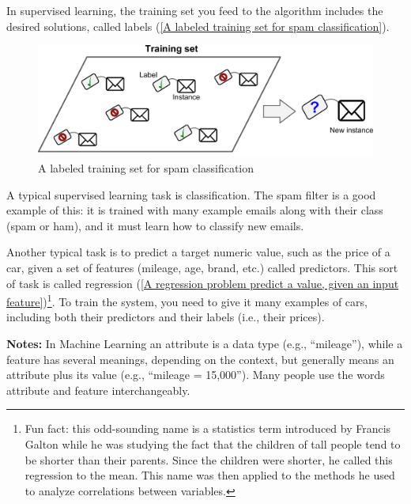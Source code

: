 In supervised learning, the training set you feed to the algorithm includes the desired
solutions, called labels (\autoref{A labeled training set for spam classification}).
\begin{figure}
\centering
\includegraphics{img/A labeled training set for spam classification.png}
\caption{A labeled training set for spam classification}
\label{A labeled training set for spam classification}
\end{figure}

A typical supervised learning task is classification. The spam filter is a good example
of this: it is trained with many example emails along with their class (spam or ham),
and it must learn how to classify new emails.

Another typical task is to predict a target numeric value, such as the price of a car,
given a set of features (mileage, age, brand, etc.) called predictors. This sort of task is
called regression (\autoref{A regression problem predict a value, given an input feature})\footnote{Fun fact: this odd-sounding name is a statistics term introduced by Francis Galton while he was studying the
fact that the children of tall people tend to be shorter than their parents. Since the children were shorter, he
called this regression to the mean. This name was then applied to the methods he used to analyze correlations
between variables.}. To train the system, you need to give it many examples
of cars, including both their predictors and their labels (i.e., their prices).

\textbf{Notes:} In Machine Learning an attribute is a data type (e.g., “mileage”),
while a feature has several meanings, depending on the context, but
generally means an attribute plus its value (e.g., “mileage =
15,000”). Many people use the words attribute and feature interchangeably.

